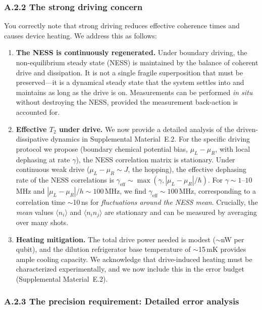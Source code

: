 \documentclass[11pt,a4paper]{article}
\begin{document}
\subsubsection*{A.2.2 The strong driving concern}

You correctly note that strong driving reduces effective coherence times and causes device heating. We address this as follows:

\begin{enumerate}[leftmargin=*]
\item \textbf{The NESS is continuously regenerated.} Under boundary driving, the non-equilibrium steady state (NESS) is maintained by the balance of coherent drive and dissipation. It is not a single fragile superposition that must be preserved---it is a dynamical steady state that the system settles into and maintains as long as the drive is on. Measurements can be performed \emph{in situ} without destroying the NESS, provided the measurement back-action is accounted for.

\item \textbf{Effective $T_2$ under drive.} We now provide a detailed analysis of the driven-dissipative dynamics in Supplemental Material~E.2. For the specific driving protocol we propose (boundary chemical potential bias, $\mu_L - \mu_R$, with local dephasing at rate $\gamma$), the NESS correlation matrix is stationary. Under continuous weak drive ($\mu_L - \mu_R \sim J$, the hopping), the effective dephasing rate of the NESS correlations is $\gamma_{\text{eff}} \sim \max(\gamma, |\mu_L - \mu_R|/\hbar)$. For $\gamma \sim 1$--$10$\,MHz and $|\mu_L - \mu_R|/h \sim 100$\,MHz, we find $\gamma_{\text{eff}} \sim 100$\,MHz, corresponding to a correlation time $\sim$10\,ns for \emph{fluctuations around the NESS mean}. Crucially, the \emph{mean} values $\langle n_i \rangle$ and $\langle n_i n_j \rangle$ are stationary and can be measured by averaging over many shots.

\item \textbf{Heating mitigation.} The total drive power needed is modest ($\sim$nW per qubit), and the dilution refrigerator base temperature of $\sim$15\,mK provides ample cooling capacity. We acknowledge that drive-induced heating must be characterized experimentally, and we now include this in the error budget (Supplemental Material~E.2).
\end{enumerate}

\subsubsection*{A.2.3 The precision requirement: Detailed error analysis}
\end{document}
